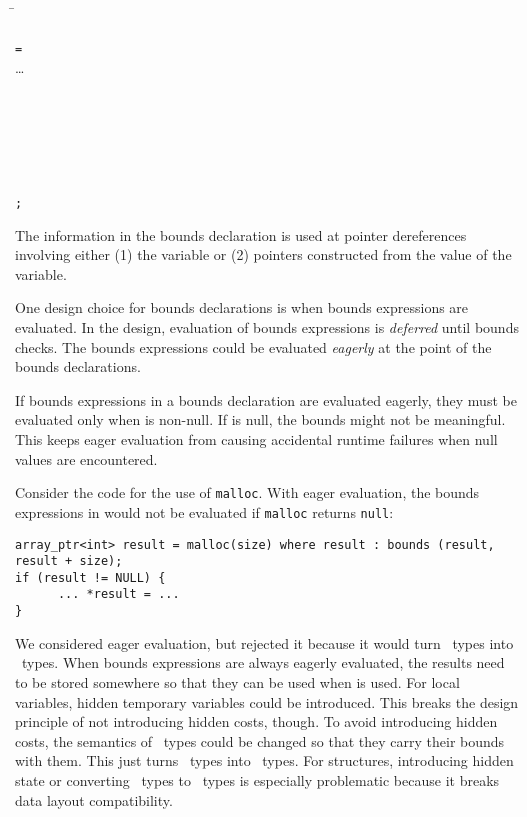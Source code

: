 \begin{tabbing}
\= \\
\> \\
\> \texttt{=}  \\
\>\ldots{} \\
\\
 \\
\> \\
\> \\
\\
\\
\>\texttt{;}
\end{tabbing}

The information in the bounds declaration is used at pointer
dereferences involving either (1) the variable or (2) pointers
constructed from the value of the variable.

One design choice for bounds declarations is when
bounds expressions are evaluated.  In the design, evaluation of
bounds expressions is {\em deferred} until bounds checks.  The bounds
expressions could be evaluated {\em eagerly} at the point of the bounds declarations.

If bounds expressions in a bounds declaration  are evaluated 
eagerly, they must  be evaluated only when  is non-null. If  is null,
the bounds might not be meaningful.  This keeps eager evaluation from
causing accidental runtime failures when null values are encountered.    

Consider the code for the use of \texttt{malloc}.   With eager evaluation,
the bounds expressions in  would not
be evaluated if \texttt{malloc} returns \texttt{null}:
\begin{verbatim}
array_ptr<int> result = malloc(size) where result : bounds (result, result + size);
if (result != NULL) {
      ... *result = ...
}
\end{verbatim}

We considered eager evaluation, but rejected it because it would turn \arrayptr\
types into \arrayview\ types.  When bounds expressions are always eagerly
evaluated, the results need to be stored somewhere so that they can be used
when \var{v} is used.  For local variables, hidden temporary variables could be
introduced.  This breaks the design principle of not introducing hidden
costs, though.  To avoid introducing hidden costs, the semantics of \arrayptr\ types could 
be changed so that they carry their bounds with them.   This just turns \arrayptr\ types into 
\arrayview\ types.   For structures, introducing hidden state or converting \arrayptr\ types to 
\arrayview\ types is especially problematic because it breaks data layout compatibility.

